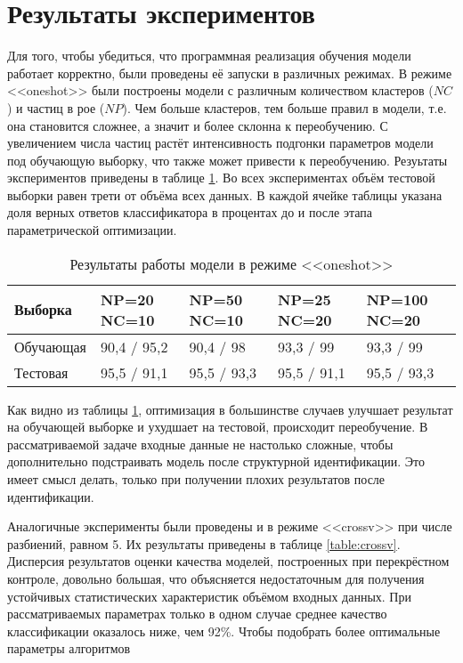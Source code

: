 \section{Результаты экспериментов}
Для того, чтобы убедиться, что программная реализация обучения модели работает
корректно, были проведены её запуски в различных режимах.
В режиме <<oneshot>> были построены модели с различным количеством кластеров (\(NC\)) и
частиц в рое (\(NP\)). Чем больше кластеров, тем больше правил в модели, т.е. она становится сложнее,
а значит и более склонна к переобучению. С увеличением числа частиц растёт интенсивность
подгонки параметров модели под обучающую выборку, что также может привести к переобучению.
Резуьтаты экспериментов приведены в таблице \ref{table:oneshot}. Во всех экспериментах объём
тестовой выборки равен трети от объёма всех данных. В каждой ячейке таблицы указана
доля верных ответов классификатора в процентах до и после этапа параметрической оптимизации.
  \begin{table}[h]
    \begin{tabular}{| l | l | l | l | l |}
      \hline
    Выборка & NP=20 NC=10 & NP=50 NC=10  & NP=25 NC=20 & NP=100 NC=20 \\ \hline
    Обучающая & 90,4 / 95,2 & 90,4 / 98 & 93,3 / 99 & 93,3 / 99 \\ \hline
    Тестовая  & 95,5 / 91,1 & 95,5 / 93,3  & 95,5 / 91,1  & 95,5 / 93,3 \\ \hline
    \end{tabular}
    \caption{Результаты работы модели в режиме <<oneshot>>}
    \label{table:oneshot}
  \end{table}
\par
Как видно из таблицы \ref{table:oneshot}, оптимизация в большинстве случаев улучшает
результат на обучающей выборке и ухудшает на тестовой, происходит переобучение.
В рассматриваемой задаче входные данные не настолько сложные, чтобы дополнительно подстраивать
модель после структурной идентификации. Это имеет смысл делать, только при получении
плохих результатов после идентификации.
\par
Аналогичные эксперименты были проведены и в режиме <<crossv>> при числе разбиений, равном 5.
Их результаты приведены в таблице \ref{table:crossv}. Дисперсия результатов оценки качества
моделей, построенных при перекрёстном контроле, довольно большая, что объясняется
недостаточным для получения устойчивых статистических характеристик объёмом входных данных.
При рассматриваемых параметрах только в одном случае среднее качество классификации
оказалось ниже, чем 92\%. Чтобы подобрать более оптимальные параметры алгоритмов
